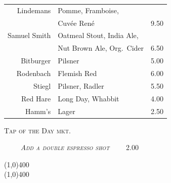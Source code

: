\documentclass[letterpaper, 12pt]{article}%
\newcommand{\flowtherefore}{~~\raisebox{0.2ex}{$\therefore$}~~}
\newcommand{\price}[2]{
 \textsc{\small#1}\flowtherefore
 \textsc{#2}
}
\newcommand{\varprice}[1]{
 \textsc{#1}
}
\newcommand{\heading}[1]{{\large\bfseries #1\par}}
\newcommand{\flowentry}[1]{
{\centering\heading{\LARGE\textbsi{#1}}\vspace{-2ex}

\line(1,0){400}\vspace{-3ex}\\ 
\line(1,0){400}\vspace{-2ex}

}}
\begin{document}
\begin{minipage}[t][\beerhi][b]{\beerwi}
 \scshape
 \centering
 \begin{tabular}{@{} r l l @{}}
  Lindemans     & Pomme, Framboise,                                             & \\
                & Cuv\'{e}e Ren\'{e}                                            & \varprice{9.50} \\
  Samuel Smith  & Oatmeal Stout, India Ale,                                     & \\
                & Nut Brown Ale, Org.\ Cider                                    & \varprice{6.50} \\
  Bitburger     & Pilsner                                                       & \varprice{5.00}\\
  Rodenbach     & Flemish Red                                                   & \varprice{6.00}\\
  Stiegl        & Pilsner, Radler                                               & \varprice{5.50}\\
  Red Hare      & Long Day, Whabbit                                             & \varprice{4.00}\\
  Hamm's        & Lager                                                         & \varprice{2.50}\\
 \end{tabular}
\end{minipage}

{\centering
 \scshape 
  Tap of the Day \hspace{1.5em} mkt.
  
}

{\centering
 \textbf{\textup{\normalsize{}}} \flowtherefore \price{\textrm{\emph{\normalsize Add a double espresso shot}}}{2.00}

}


\flowentry{Go\^{u}ts}

\end{document}
